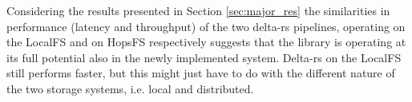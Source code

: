Considering the results presented in Section \ref{sec:major_res} the similarities in performance (latency and throughput) of the two delta-rs pipelines, operating on the \gls{LocalFS} and on \gls{HopsFS} respectively suggests that the library is operating at its full potential also in the newly implemented system. Delta-rs on the \gls{LocalFS} still performs faster, but this might just have to do with the different nature of the two storage systems, i.e. local and distributed.







